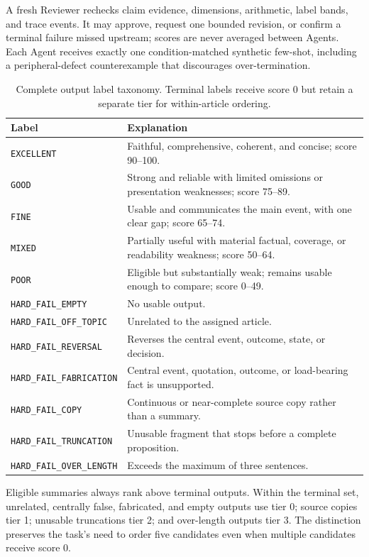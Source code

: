 \documentclass[conference]{IEEEtran}
\begin{document}
A fresh Reviewer rechecks claim evidence, dimensions, arithmetic, label bands, and trace events. It may approve, request one bounded revision, or confirm a terminal failure missed upstream; scores are never averaged between Agents. Each Agent receives exactly one condition-matched synthetic few-shot, including a peripheral-defect counterexample that discourages over-termination.

\begin{table}[t]
\caption{Complete output label taxonomy. Terminal labels receive score 0 but retain a separate tier for within-article ordering.}
\label{tab:labels}
\centering
\footnotesize
\begin{tabularx}{0.96\textwidth}{@{}p{43mm}Y@{}}
\toprule
\textbf{Label} & \textbf{Explanation} \\
\midrule
\texttt{EXCELLENT} & Faithful, comprehensive, coherent, and concise; score 90--100. \\
\texttt{GOOD} & Strong and reliable with limited omissions or presentation weaknesses; score 75--89. \\
\texttt{FINE} & Usable and communicates the main event, with one clear gap; score 65--74. \\
\texttt{MIXED} & Partially useful with material factual, coverage, or readability weakness; score 50--64. \\
\texttt{POOR} & Eligible but substantially weak; remains usable enough to compare; score 0--49. \\
\texttt{HARD\_FAIL\_EMPTY} & No usable output. \\
\texttt{HARD\_FAIL\_OFF\_TOPIC} & Unrelated to the assigned article. \\
\texttt{HARD\_FAIL\_REVERSAL} & Reverses the central event, outcome, state, or decision. \\
\texttt{HARD\_FAIL\_FABRICATION} & Central event, quotation, outcome, or load-bearing fact is unsupported. \\
\texttt{HARD\_FAIL\_COPY} & Continuous or near-complete source copy rather than a summary. \\
\texttt{HARD\_FAIL\_TRUNCATION} & Unusable fragment that stops before a complete proposition. \\
\texttt{HARD\_FAIL\_OVER\_LENGTH} & Exceeds the maximum of three sentences. \\
\bottomrule
\end{tabularx}
\end{table}

Eligible summaries always rank above terminal outputs. Within the terminal set, unrelated, centrally false, fabricated, and empty outputs use tier 0; source copies tier 1; unusable truncations tier 2; and over-length outputs tier 3. The distinction preserves the task's need to order five candidates even when multiple candidates receive score 0.
\end{document}
